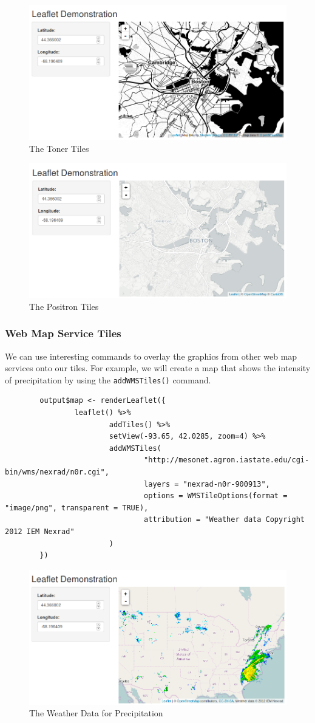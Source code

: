 	\begin{figure}[htbp!]
		\centering
		\includegraphics[width=.5\textwidth]{pictures/html/htmlwidgets-image-2.png}
		\caption{The Toner Tiles}
	\end{figure}

	\begin{figure}[htbp!]
		\caption{The Positron Tiles}
		\centering
		\includegraphics[width=.5\textwidth]{pictures/html/htmlwidgets-image-3.png}
	\end{figure}

	\subsubsection{Web Map Service Tiles}
	
	We can use interesting commands to overlay the graphics from other web map services onto our tiles.
        For example, we will create a map that shows the intensity of precipitation by using the \texttt{addWMSTiles()} command.
	
        \begin{lstlisting}
        output$map <- renderLeaflet({
                leaflet() %>%
                        addTiles() %>%
                        setView(-93.65, 42.0285, zoom=4) %>%
                        addWMSTiles(
                                "http://mesonet.agron.iastate.edu/cgi-bin/wms/nexrad/n0r.cgi",
                                layers = "nexrad-n0r-900913",
                                options = WMSTileOptions(format = "image/png", transparent = TRUE),
                                attribution = "Weather data Copyright 2012 IEM Nexrad"
                        )
        })
        \end{lstlisting}

	\begin{figure}[htbp!]
		\centering
		\includegraphics[width=.5\textwidth]{pictures/html/htmlwidgets-image-4.png}
		\caption{The Weather Data for Precipitation}
	\end{figure}

